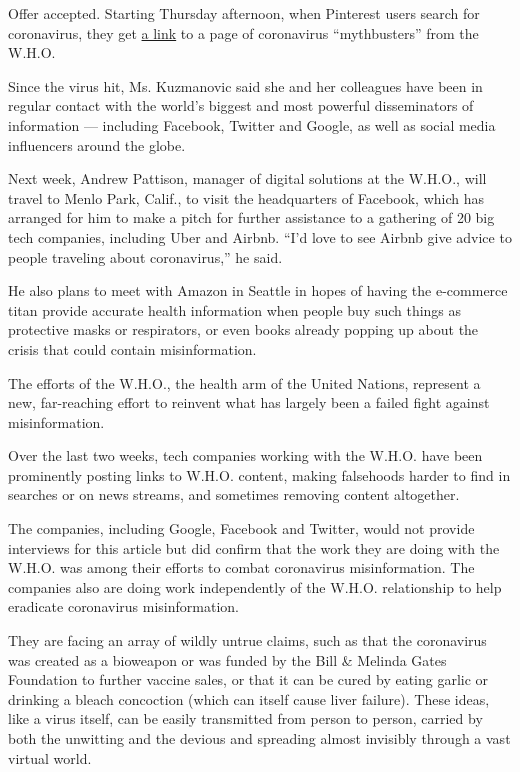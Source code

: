 Offer accepted. Starting Thursday afternoon, when Pinterest users search
for coronavirus, they get
\href{https://www.pinterest.ch/worldhealthorganization/2019-ncov-new-coronavirus/}{a
link} to a page of coronavirus ``mythbusters'' from the W.H.O.

Since the virus hit, Ms. Kuzmanovic said she and her colleagues have
been in regular contact with the world's biggest and most powerful
disseminators of information --- including Facebook, Twitter and Google,
as well as social media influencers around the globe.

Next week, Andrew Pattison, manager of digital solutions at the W.H.O.,
will travel to Menlo Park, Calif., to visit the headquarters of
Facebook, which has arranged for him to make a pitch for further
assistance to a gathering of 20 big tech companies, including Uber and
Airbnb. ``I'd love to see Airbnb give advice to people traveling about
coronavirus,'' he said.

He also plans to meet with Amazon in Seattle in hopes of having the
e-commerce titan provide accurate health information when people buy
such things as protective masks or respirators, or even books already
popping up about the crisis that could contain misinformation.

The efforts of the W.H.O., the health arm of the United Nations,
represent a new, far-reaching effort to reinvent what has largely been a
failed fight against misinformation.

Over the last two weeks, tech companies working with the W.H.O. have
been prominently posting links to W.H.O. content, making falsehoods
harder to find in searches or on news streams, and sometimes removing
content altogether.

The companies, including Google, Facebook and Twitter, would not provide
interviews for this article but did confirm that the work they are doing
with the W.H.O. was among their efforts to combat coronavirus
misinformation. The companies also are doing work independently of the
W.H.O. relationship to help eradicate coronavirus misinformation.

They are facing an array of wildly untrue claims, such as that the
coronavirus was created as a bioweapon or was funded by the Bill \&
Melinda Gates Foundation to further vaccine sales, or that it can be
cured by eating garlic or drinking a bleach concoction (which can itself
cause liver failure). These ideas, like a virus itself, can be easily
transmitted from person to person, carried by both the unwitting and the
devious and spreading almost invisibly through a vast virtual world.

